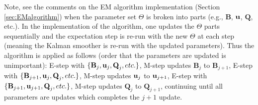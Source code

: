 \documentclass[]{article}
\def\UPS{\mbox{\boldmath $\Upsilon$}}
\def\BB{\mbox{$\mathbf B$}}	\def\bb{\mbox{$\mathbf b$}} \def\Bb{\mbox{$\mathbf J$}} \def\Ba{\mbox{$\mathbf L$}} \def\Bm{\UPS}
\def\QQ{\mbox{$\mathbf Q$}}	 \def\qq{\mbox{$\mathbf q$}} \def\Qb{\mbox{$\mathbf G$}}  \def\Qm{\mathbb{Q}}
\begin{document}
Note, see the comments on the EM algorithm implementation (Section \ref{sec:EMalgorithm}) when the parameter set $\Theta$ is broken into parts (e.g., $\BB$, $\mbox{$\mathbf u$}$, $\QQ$, etc.). In the implementation of the algorithm, one updates the $\Theta$ parts sequentially and the expectation step is re-run with the new $\Theta$ at each step (meaning the Kalman smoother is re-run with the updated parameters). Thus the algorithm is applied as follows (order that the parameters are updated is unimportant): E-step with $\{\BB_j, \uu_j, \QQ_j, etc.\}$, M-step updates $\BB_j$ to $\BB_{j+1}$, E-step with $\{\BB_{j+1}, \uu_j, \QQ_j, etc.\}$, M-step updates $\mbox{$\mathbf u$}_j$ to $\mbox{$\mathbf u$}_{j+1}$, E-step with $\{\BB_{j+1}, \uu_{j+1}, \QQ_j, etc.\}$, M-step updates $\QQ_j$ to $\QQ_{j+1}$, continuing until all parameters are updates which completes the $j+1$ update.
\end{document}
